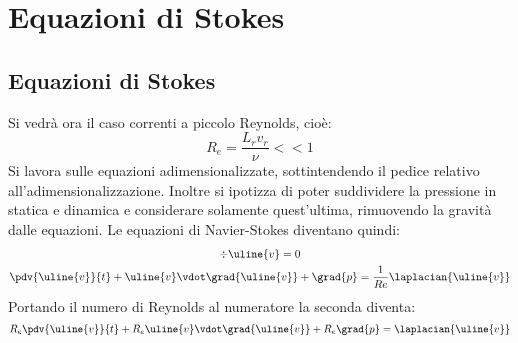 %
\section{Equazioni di Stokes}
\subsection{Equazioni di Stokes}
Si vedrà ora il caso correnti a piccolo Reynolds, cioè:
%
	\begin{equation*}
		R_e = \frac{L_r v_r}{\nu} << 1
	\end{equation*}
%
Si lavora sulle equazioni adimensionalizzate, sottintendendo il pedice relativo all'adimensionalizzazione.
Inoltre si ipotizza di poter suddividere la pressione in statica e dinamica e considerare solamente quest'ultima, rimuovendo la gravità dalle equazioni.
Le equazioni di Navier-Stokes diventano quindi:
%
	\begin{equation*}
		\begin{gathered}
			\div{\uline{v}} = 0\\
			\pdv{\uline{v}}{t} + \uline{v} \vdot \grad{\uline{v}} + \grad{p} = \frac{1}{Re} \laplacian{\uline{v}}
		\end{gathered}
	\end{equation*} 
%
Portando il numero di Reynolds al numeratore la seconda diventa:
%
	\begin{equation*}
		R_e \pdv{\uline{v}}{t} + R_e \uline{v} \vdot \grad{\uline{v}} + R_e \grad{p} = \laplacian{\uline{v}}
	\end{equation*} 
%

